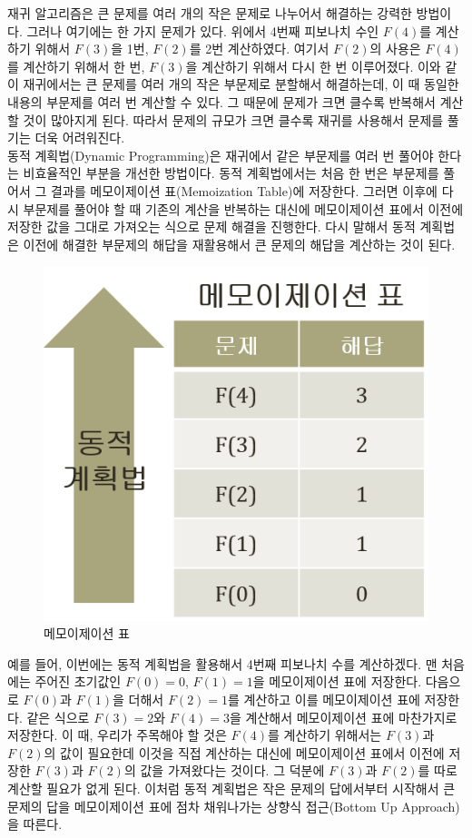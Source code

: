 \documentclass[a4paper]{oblivoir}
\begin{document}
재귀 알고리즘은 큰 문제를 여러 개의 작은 문제로 나누어서 해결하는 강력한 방법이다. 그러나 여기에는 한 가지 문제가 있다. 위에서 4번째 피보나치 수인 $F(4)$를 계산하기 위해서 $F(3)$을 1번, $F(2)$를 2번 계산하였다. 여기서 $F(2)$의 사용은 $F(4)$를 계산하기 위해서 한 번, $F(3)$을 계산하기 위해서 다시 한 번 이루어졌다. 이와 같이 재귀에서는 큰 문제를 여러 개의 작은 부문제로 분할해서 해결하는데, 이 때 동일한 내용의 부문제를 여러 번 계산할 수 있다. 그 때문에 문제가 크면 클수록 반복해서 계산할 것이 많아지게 된다. 따라서 문제의 규모가 크면 클수록 재귀를 사용해서 문제를 풀기는 더욱 어려워진다. \\

동적 계획법(Dynamic Programming)은 재귀에서 같은 부문제를 여러 번 풀어야 한다는 비효율적인 부분을 개선한 방법이다. 동적 계획법에서는 처음 한 번은 부문제를 풀어서 그 결과를 메모이제이션 표(Memoization Table)에 저장한다. 그러면 이후에 다시 부문제를 풀어야 할 때 기존의 계산을 반복하는 대신에 메모이제이션 표에서 이전에 저장한 값을 그대로 가져오는 식으로 문제 해결을 진행한다. 다시 말해서 동적 계획법은 이전에 해결한 부문제의 해답을 재활용해서 큰 문제의 해답을 계산하는 것이 된다. \\

\begin{figure}[ht] \centering 
\includegraphics[scale=0.6]{fig9_12.png} 
\caption{메모이제이션 표}
\label{fig:9-12}
\end{figure}

예를 들어, 이번에는 동적 계획법을 활용해서 4번째 피보나치 수를 계산하겠다. 맨 처음에는 주어진 초기값인 $F(0)=0$, $F(1)=1$을 메모이제이션 표에 저장한다. 다음으로 $F(0)$과 $F(1)$을 더해서 $F(2)=1$를 계산하고 이를 메모이제이션 표에 저장한다. 같은 식으로 $F(3)=2$와 $F(4)=3$을 계산해서 메모이제이션 표에 마찬가지로 저장한다. 이 때, 우리가 주목해야 할 것은 $F(4)$를 계산하기 위해서는 $F(3)$과 $F(2)$의 값이 필요한데 이것을 직접 계산하는 대신에 메모이제이션 표에서 이전에 저장한 $F(3)$과 $F(2)$의 값을 가져왔다는 것이다. 그 덕분에 $F(3)$과 $F(2)$를 따로 계산할 필요가 없게 된다. 이처럼 동적 계획법은 작은 문제의 답에서부터 시작해서 큰 문제의 답을 메모이제이션 표에 점차 채워나가는 상향식 접근(Bottom Up Approach)을 따른다.
\end{document}
